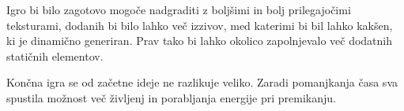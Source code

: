 \documentclass[a4paper]{article}
\begin{document}
Igro bi bilo zagotovo mogoče nadgraditi z boljšimi in bolj prilegajočimi teksturami, dodanih bi bilo lahko več izzivov, med katerimi bi bil lahko kakšen, ki je dinamično generiran. Prav tako bi lahko okolico zapolnjevalo več dodatnih statičnih elementov.

Končna igra se od začetne ideje ne razlikuje veliko. Zaradi pomanjkanja časa sva spustila možnost več življenj in porabljanja energije pri premikanju.


\small


\end{document}
